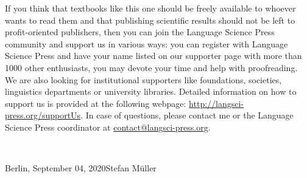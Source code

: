 If you think that textbooks like this one should be freely available to whoever wants to read them
and that publishing scientific results should not be left to profit-oriented publishers, then you
can join the Language Science Press community and support us in various ways: you can register with Language Science Press and have your name
listed on our supporter page with more than 1000 other enthusiasts, you may devote your time and help
with proofreading. We are also looking for institutional supporters like foundations,
societies, linguistics departments or university libraries. Detailed information on how to support
us is provided at the following webpage: \url{http://langsci-press.org/supportUs}.
In case of questions, please contact me or the Language Science Press coordinator at \href{mailto:contact@langsci-press.org}{contact@langsci-press.org}.


~\medskip

\noindent
Berlin, September 04, 2020\hfill Stefan Müller


